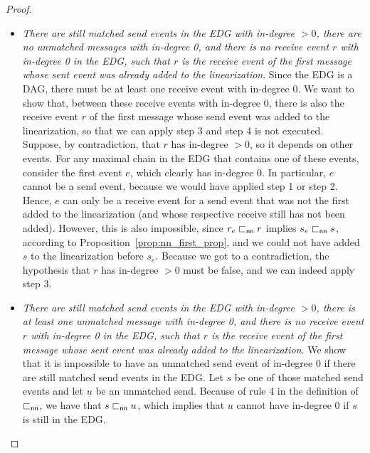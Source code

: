 \begin{proof}
\begin{itemize}
		\item \emph{There are still matched send events in the EDG with in-degree $>0$, there are no unmatched messages with in-degree 0, and there is no receive event $r$ with in-degree 0 in the EDG, such that $r$ is the receive event of the first message whose sent event was already added to the linearization}. Since the EDG is a DAG, there must be at least one receive event with in-degree 0. We want to show that, between these receive events with in-degree 0, there is also the receive event $r$ of the first message whose send event was added to the linearization, so that we can apply step 3 and step 4 is not executed. Suppose, by contradiction, that $r$ has in-degree $>0$, so it depends on other events. For any maximal chain in the EDG that contains one of these events, consider the first event $e$, which clearly has in-degree 0. In particular, $e$ cannot be a send event, because we would have applied step 1 or step 2. Hence, $e$ can only be a receive event for a send event that was not the first added to the linearization (and whose respective receive still has not been added). However, this is also impossible, since $r_e \sqsubset_{\mathsf{nn}} r$ implies $s_e \sqsubset_{\mathsf{nn}} s$, according to Proposition~\ref{prop:nn_first_prop}, and we could not have added $s$ to the linearization before $s_e$. Because we got to a contradiction, the hypothesis that $r$ has in-degree $>0$ must be false, and we can indeed apply step 3.
		\item \emph{There are still matched send events in the EDG with in-degree $>0$, there is at least one unmatched message with in-degree 0, and there is no receive event $r$ with in-degree 0 in the EDG, such that $r$ is the receive event of the first message whose sent event was already added to the linearization}. We show that it is impossible to have an unmatched send event of in-degree 0 if there are still matched send events in the EDG. Let $s$ be one of those matched send events and let $u$ be an unmatched send. Because of rule 4 in the definition of $\sqsubset_{\mathsf{nn}}$, we have that $s \sqsubset_{\mathsf{nn}} u$, which implies that $u$ cannot have in-degree 0 if $s$ is still in the EDG.

\end{itemize}
\end{proof}

